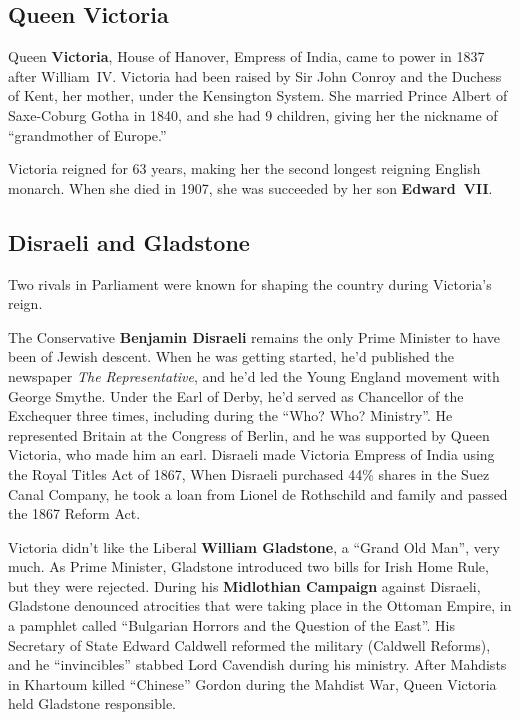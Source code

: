 \subsection*{Queen Victoria}

Queen \textbf{Victoria}, House of Hanover, Empress of India, came to power in 1837 after William~IV\@.
Victoria had been raised by Sir John Conroy and the Duchess of Kent, her mother, under the Kensington System.
She married Prince Albert of Saxe-Coburg Gotha in 1840, and she had 9 children,
giving her the nickname of ``grandmother of Europe.''

Victoria reigned for 63 years, making her the second longest reigning English monarch.
When she died in 1907, she was succeeded by her son \textbf{Edward~VII}.

\subsection*{Disraeli and Gladstone}

Two rivals in Parliament were known for shaping the country during Victoria's reign.

The Conservative \textbf{Benjamin Disraeli} remains the only Prime Minister to have been of Jewish descent.
When he was getting started, he'd published the newspaper \textit{The Representative},
and he'd led the Young England movement with George Smythe.
Under the Earl of Derby, he'd served as Chancellor of the Exchequer three times,
including during the ``Who? Who? Ministry''.
He represented Britain at the Congress of Berlin, and he was supported by Queen Victoria, who made him an earl.
Disraeli made Victoria Empress of India using the Royal Titles Act of 1867,
When Disraeli purchased 44\% shares in the Suez Canal Company,
he took a loan from Lionel de Rothschild and family and passed the 1867 Reform Act.

Victoria didn't like the Liberal \textbf{William Gladstone}, a ``Grand Old Man'', very much.
As Prime Minister, Gladstone introduced two bills for Irish Home Rule, but they were rejected.
During his \textbf{Midlothian Campaign} against Disraeli,
Gladstone denounced atrocities that were taking place in the Ottoman Empire,
in a pamphlet called ``Bulgarian Horrors and the Question of the East''.
His Secretary of State Edward Caldwell reformed the military (Caldwell Reforms),
and he ``invincibles'' stabbed Lord Cavendish during his ministry.
After Mahdists in Khartoum killed ``Chinese'' Gordon during the Mahdist War,
Queen Victoria held Gladstone responsible.

